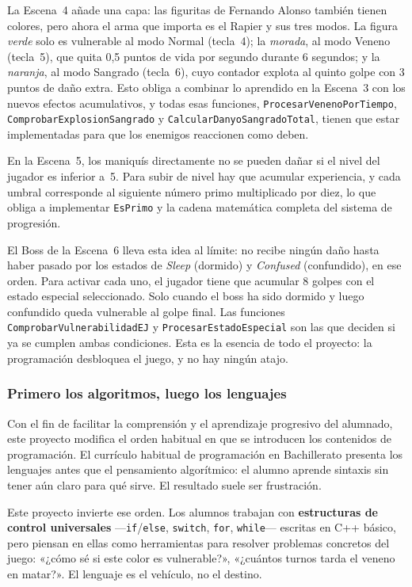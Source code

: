 \documentclass[a4paper,12pt]{article}
\begin{document}
La Escena~4 añade una capa: las figuritas de Fernando Alonso también
tienen colores, pero ahora el arma que importa es el Rapier y sus tres
modos. La figura \textit{verde} solo es vulnerable al modo Normal
(tecla~4); la \textit{morada}, al modo Veneno (tecla~5), que quita
0{,}5 puntos de vida por segundo durante 6 segundos; y la
\textit{naranja}, al modo Sangrado (tecla~6), cuyo contador explota
al quinto golpe con 3 puntos de daño extra. Esto obliga a combinar
lo aprendido en la Escena~3 con los nuevos efectos acumulativos, y
todas esas funciones, \texttt{ProcesarVenenoPorTiempo},
\texttt{ComprobarExplosionSangrado} y \texttt{CalcularDanyoSangradoTotal},
tienen que estar implementadas para que los enemigos reaccionen como deben.

En la Escena~5, los maniquís directamente no se pueden dañar si el nivel
del jugador es inferior a~5. Para subir de nivel hay que acumular
experiencia, y cada umbral corresponde al siguiente número primo
multiplicado por diez, lo que obliga a implementar \texttt{EsPrimo} y
la cadena matemática completa del sistema de progresión.

El Boss de la Escena~6 lleva esta idea al límite: no recibe ningún
daño hasta haber pasado por los estados de \textit{Sleep} (dormido)
y \textit{Confused} (confundido), en ese orden. Para activar cada
uno, el jugador tiene que acumular 8 golpes con el estado especial
seleccionado. Solo cuando el boss ha sido dormido y luego confundido
queda vulnerable al golpe final. Las funciones
\texttt{ComprobarVulnerabilidadEJ} y \texttt{ProcesarEstadoEspecial}
son las que deciden si ya se cumplen ambas condiciones. Esta es la
esencia de todo el proyecto: la programación desbloquea el juego,
y no hay ningún atajo.

\subsubsection{Primero los algoritmos, luego los lenguajes}

Con el fin de facilitar la comprensión y el aprendizaje progresivo del alumnado, este proyecto 
modifica el orden habitual en que se introducen los contenidos de programación. El currículo 
habitual de programación en Bachillerato presenta los lenguajes antes que el pensamiento
algorítmico: el alumno aprende sintaxis sin tener aún claro para qué sirve. El resultado suele ser frustración.

Este proyecto invierte ese orden. Los alumnos trabajan con \textbf{estructuras de control
universales} —\texttt{if}/\texttt{else}, \texttt{switch}, \texttt{for}, \texttt{while}—
escritas en C++ básico, pero piensan en ellas como herramientas para resolver problemas concretos
del juego: «¿cómo sé si este color es vulnerable?», «¿cuántos turnos tarda el veneno en matar?».
El lenguaje es el vehículo, no el destino.
\end{document}
